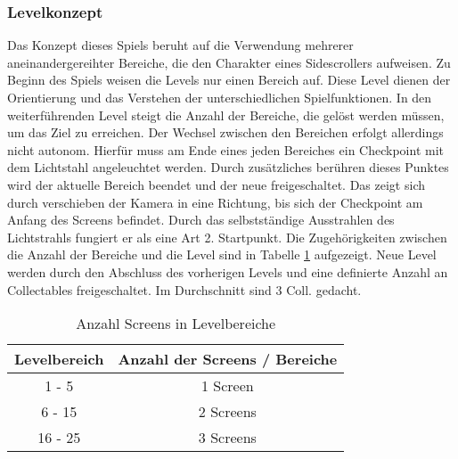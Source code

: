 \subsubsection{Levelkonzept}
Das Konzept dieses Spiels beruht auf die Verwendung mehrerer aneinandergereihter Bereiche, die den Charakter eines Sidescrollers aufweisen. Zu Beginn des Spiels weisen die Levels nur einen Bereich auf. Diese Level dienen der Orientierung und das Verstehen der unterschiedlichen Spielfunktionen. In den weiterführenden Level steigt die Anzahl der Bereiche, die gelöst werden müssen, um das Ziel zu erreichen. Der Wechsel zwischen den Bereichen erfolgt allerdings nicht autonom. Hierfür muss am Ende eines jeden Bereiches ein Checkpoint mit dem Lichtstahl angeleuchtet werden. Durch zusätzliches berühren dieses Punktes wird der aktuelle Bereich beendet und der neue freigeschaltet. Das zeigt sich durch verschieben der Kamera in eine Richtung, bis sich der Checkpoint am Anfang des Screens befindet. Durch das selbstständige Ausstrahlen des Lichtstrahls fungiert er als eine Art 2. Startpunkt. Die Zugehörigkeiten zwischen die Anzahl der Bereiche und die Level sind in Tabelle \ref{screenLevel} aufgezeigt. Neue Level werden durch den Abschluss des vorherigen Levels und  eine definierte Anzahl an Collectables freigeschaltet. Im Durchschnitt sind 3 Coll. gedacht.

\begin{table}[H]
\centering
\begin{tabular}{c|c}
Levelbereich & Anzahl der Screens / Bereiche \\ \hline
1 - 5  & 1 Screen \\ 
6 - 15 & 2 Screens \\
16 - 25 & 3 Screens      
\end{tabular}
\caption{Anzahl Screens in Levelbereiche}
\label{screenLevel}
\end{table}

